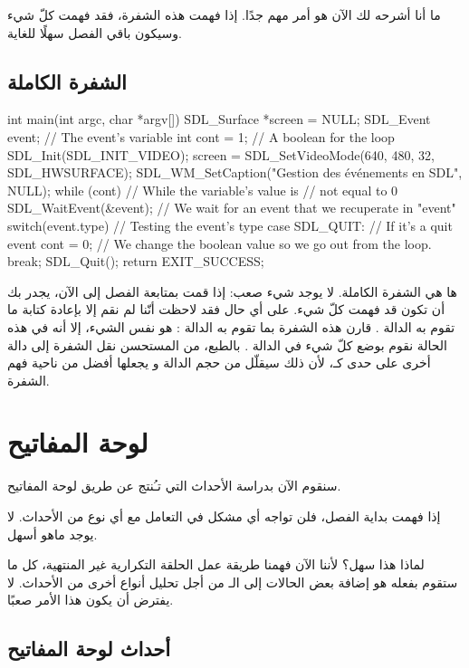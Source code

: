 ما أنا أشرحه لك الآن هو أمر مهم جدًا. إذا فهمت هذه الشفرة، فقد فهمت كلّ شيء وسيكون باقي الفصل سهلًا للغاية.

\subsection{الشفرة الكاملة}

\begin{Csource}
int main(int argc, char *argv[])
{
	SDL_Surface *screen = NULL;
	SDL_Event event; // The event's variable
	int cont = 1; // A boolean for the loop
	SDL_Init(SDL_INIT_VIDEO);
	screen = SDL_SetVideoMode(640, 480, 32, SDL_HWSURFACE);
	SDL_WM_SetCaption("Gestion des événements en SDL", NULL);
	while (cont) // While the variable's value is 
	{            // not equal to 0
		SDL_WaitEvent(&event); // We wait for an event that we recuperate in "event"
		switch(event.type) // Testing the event's type
		{
			case SDL_QUIT: // If it's a quit event
			cont = 0; // We change the boolean value so we go out from the loop.
			break;
		}
	}
	SDL_Quit();
	return EXIT_SUCCESS;
}
\end{Csource}

ها هي الشفرة الكاملة. لا يوجد شيء صعب: إذا قمت بمتابعة الفصل إلى الآن، يجدر بك أن تكون قد فهمت كلّ شيء. على أي حال فقد لاحظت أنّنا لم نقم إلا بإعادة كتابة ما تقوم به الدالة 
.
قارن هذه الشفرة بما تقوم به الدالة
:
هو نفس الشيء، إلا أنه في هذه الحالة نقوم بوضع كلّ شيء في الدالة
.
بالطبع، من المستحسن نقل الشفرة إلى دالة أخرى على حدى كـ،
لأن ذلك سيقلّل من حجم الدالة
و يجعلها أفضل من ناحية فهم الشفرة.

\section{لوحة المفاتيح}

سنقوم الآن بدراسة الأحداث التي تـُنتج عن طريق لوحة المفاتيح.

إذا فهمت بداية الفصل، فلن تواجه أي مشكل في التعامل مع أي نوع من الأحداث. لا يوجد ماهو أسهل.

لماذا هذا سهل؟ لأننا الآن فهمنا طريقة عمل الحلقة التكرارية غير المنتهية، كل ما ستقوم بفعله هو إضافة بعض الحالات إلى الـ
من أجل تحليل أنواع أخرى من الأحداث. لا يفترض أن يكون هذا الأمر صعبًا.

\subsection{أحداث لوحة المفاتيح}

